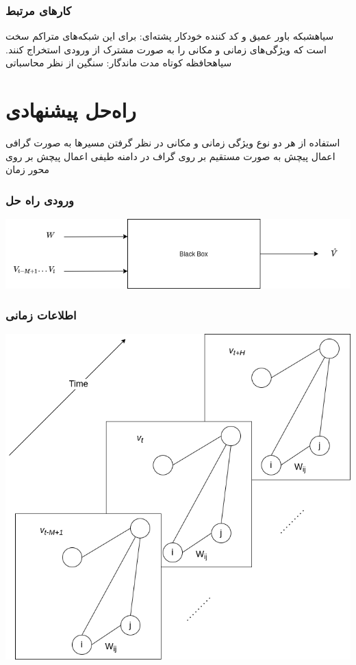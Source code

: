 \documentclass{beamer}
\begin{document}
\begin{frame}
  \frametitle{کارهای مرتبط}
   ‌سیاه{شبکه باور عمیق و کد کننده خودکار پشته‌ای}: برای این شبکه‌های متراکم
  سخت است که ویژگی‌های زمانی و مکانی را به صورت مشترک از ورودی استخراج کنند.
   ‌سیاه{حافظه کوتاه مدت ماندگار}: سنگین از نظر محاسباتی
\end{frame}

\section{راه‌حل پیشنهادی}

\begin{frame}
   استفاده از هر دو نوع ویژگی زمانی و مکانی
   در نظر گرفتن مسیرها به صورت گرافی
   اعمال پیچش به صورت مستقیم بر روی گراف در دامنه طیفی
   اعمال پیچش بر روی محور زمان
\end{frame}

\begin{frame}
  \frametitle{ورودی راه حل}
  \includegraphics[width=\textwidth]{img/blackbox.png}
\end{frame}

\begin{frame}
  \frametitle{اطلاعات زمانی}
  \includegraphics[height=.5\textheight]{img/V.png}
\end{frame}
\end{document}
